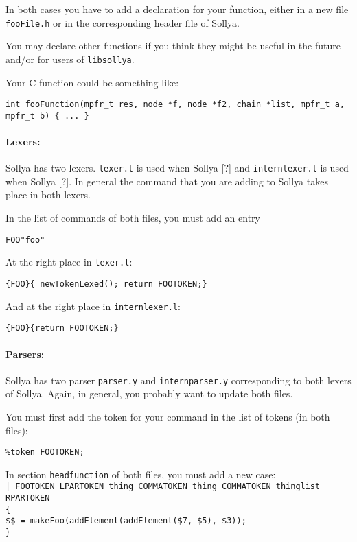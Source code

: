\documentclass{article}
\newcommand{\commandName}{\texttt{foo}\xspace}
\newcommand{\commandFunction}{\texttt{fooFunction}\xspace}
\newcommand{\commandFile}[1]{\texttt{fooFile#1}\xspace}
\newcommand{\commandLexer}{\texttt{FOO}\xspace}
\newcommand{\commandToken}{\texttt{FOOTOKEN}\xspace}
\newcommand{\commandMakeFunc}{\texttt{makeFoo}}
\begin{document}
In both cases you have to add a declaration for your function, either in a new file \commandFile{.h} or in the corresponding header file of Sollya.

You may declare other functions if you think they might be useful in the future and/or for users of \texttt{libsollya}. 

Your C function could be something like:
\begin{center}
  \texttt{int }\commandFunction\texttt{(mpfr\_t res, node *f, node *f2, chain *list, mpfr\_t a, mpfr\_t b) \{ ... \}}
\end{center}


\paragraph{Lexers: } Sollya has two lexers. \texttt{lexer.l} is used when Sollya [?] and \texttt{internlexer.l} is used when Sollya [?]. In general the command that you are adding to Sollya takes place in both lexers.

In the list of commands of both files, you must add an entry
\begin{center}
  \commandLexer\qquad\texttt{"}\commandName\texttt{"}
\end{center}
At the right place in \texttt{lexer.l}:
\begin{center}
  \texttt{\{}\commandLexer\texttt{\}\qquad \{ newTokenLexed(); return }\commandToken\texttt{;\}}
\end{center}
And at the right place in \texttt{internlexer.l}:
\begin{center}
  \texttt{\{}\commandLexer\texttt{\}\qquad \{return }\commandToken\texttt{;\}}
\end{center}


\paragraph{Parsers:} Sollya has two parser \texttt{parser.y} and \texttt{internparser.y} corresponding to both lexers of Sollya. Again, in general, you probably want to update both files.

You must first add the token for your command in the list of tokens (in both files):
\begin{center}
  \texttt{\%token   }\commandToken\texttt{;}
\end{center}

In section \texttt{headfunction} of both files, you must add a new case:\\
    \texttt{| }\commandToken\texttt{ LPARTOKEN thing COMMATOKEN thing COMMATOKEN thinglist RPARTOKEN}\\
    \phantom{1}\quad\texttt{\{}\\
    \phantom{1}\qquad\texttt{\$\$ =  }\commandMakeFunc\texttt{(addElement(addElement(\$7, \$5), \$3));}\\
    \phantom{1}\quad\texttt{\}}
\end{document}
